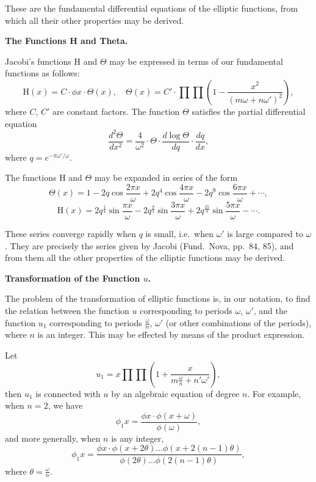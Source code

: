 \documentclass[12pt,a4paper]{article}
\begin{document}
These are the fundamental differential equations of the elliptic functions, from which
all their other properties may be derived.

\medskip

\textbf{The Functions H and Theta.}

Jacobi's functions $\mathrm{H}$ and $\Theta$ may be expressed in terms of our fundamental
functions as follows:
\[
\mathrm{H}(x) = C \cdot \phi x \cdot \Theta(x),\quad \Theta(x) = C' \cdot \prod \prod \left(1 - \frac{x^2}{(m\omega + n\omega')^2}\right),
\]
where $C$, $C'$ are constant factors. The function $\Theta$ satisfies the partial differential
equation
\[
\frac{d^2 \Theta}{dx^2} = \frac{4}{\omega^2} \cdot \Theta \cdot \frac{d \log \Theta}{dq} \cdot \frac{dq}{dx},
\]
where $q = e^{-\pi \omega'/\omega}$.

\newpage
\setcounter{page}{145}

The functions $\mathrm{H}$ and $\Theta$ may be expanded in series of the form
\[
\Theta(x) = 1 - 2q \cos\frac{2\pi x}{\omega} + 2q^4 \cos\frac{4\pi x}{\omega} - 2q^9 \cos\frac{6\pi x}{\omega} + \cdots,
\]
\[
\mathrm{H}(x) = 2q^{\frac{1}{4}} \sin\frac{\pi x}{\omega} - 2q^{\frac{9}{4}} \sin\frac{3\pi x}{\omega} + 2q^{\frac{25}{4}} \sin\frac{5\pi x}{\omega} - \cdots.
\]

These series converge rapidly when $q$ is small, i.e.\ when $\omega'$ is large compared to $\omega$.
They are precisely the series given by Jacobi (Fund.\ Nova, pp.~84, 85), and from
them all the other properties of the elliptic functions may be derived.

\medskip

\textbf{Transformation of the Function $u$.}

The problem of the transformation of elliptic functions is, in our notation, to find
the relation between the function $u$ corresponding to periods $\omega$, $\omega'$, and the function
$u_1$ corresponding to periods $\frac{\omega}{n}$, $\omega'$ (or other combinations of the periods), where $n$ is
an integer. This may be effected by means of the product expression.

\newpage
\setcounter{page}{146}

Let
\[
u_1 = x \prod \prod \left(1 + \frac{x}{m\frac{\omega}{n} + n'\omega'}\right),\]
then $u_1$ is connected with $u$ by an algebraic equation of degree $n$. For example,
when $n = 2$, we have
\[
\phi_1 x = \frac{\phi x \cdot \phi(x + \omega)}{\phi(\omega)},
\]
and more generally, when $n$ is any integer,
\[
\phi_1 x = \frac{\phi x \cdot \phi(x + 2\theta) \ldots \phi(x + 2(n-1)\theta)}{\phi(2\theta) \ldots \phi(2(n-1)\theta)},
\]
where $\theta = \frac{\omega}{n}$.
\end{document}
